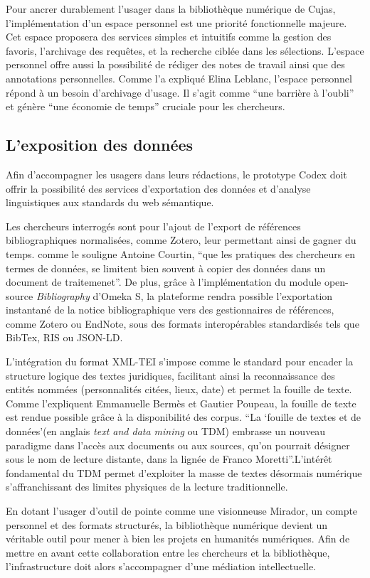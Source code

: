 Pour ancrer durablement l'usager dans la bibliothèque numérique de Cujas, l'implémentation d'un espace personnel est une priorité fonctionnelle majeure. Cet espace proposera des services simples et intuitifs comme la gestion des favoris, l'archivage des requêtes, et la recherche ciblée dans les sélections. L'espace personnel offre aussi la possibilité de rédiger des notes de travail ainsi que des annotations personnelles. Comme l'a expliqué Elina Leblanc, l'espace personnel répond à un besoin d'archivage d'usage. Il s'agit comme \enquote{une barrière à l'oubli} et génère \enquote{une économie de temps} cruciale pour les chercheurs.

\subsection{L'exposition des données}
Afin d'accompagner les usagers dans leurs rédactions, le prototype Codex doit offrir la possibilité des services d'exportation des données et d'analyse linguistiques aux standards du web sémantique.

Les chercheurs interrogés sont pour l'ajout de l'export de références bibliographiques normalisées, comme Zotero, leur permettant ainsi de gagner du temps. comme le souligne Antoine Courtin, \enquote{que les pratiques des chercheurs en termes de données, se limitent bien souvent à copier des données dans un document de traitemenet}. De plus, grâce à l'implémentation du module open-source \textit{Bibliography} d'Omeka S, la plateforme rendra possible l'exportation instantané de la notice bibliographique vers des gestionnaires de références, comme Zotero ou EndNote, sous des formats interopérables standardisés tels que BibTex, RIS ou JSON-LD.

L'intégration du format XML-TEI s'impose comme le standard pour encader la structure logique des textes juridiques, facilitant ainsi la reconnaissance des entités nommées (personnalités citées, lieux, date) et permet la fouille de texte. Comme l'expliquent Emmanuelle Bermès et Gautier Poupeau, la fouille de texte est rendue possible grâce à la disponibilité des corpus. \enquote{La \enquote{fouille de textes et de données}(en anglais \textit{text and data mining} ou TDM) embrasse un nouveau paradigme dans l'accès aux documents ou aux sources, qu'on pourrait désigner sous le nom de lecture distante, dans la lignée de Franco Moretti}.L'intérêt fondamental du TDM permet d'exploiter la masse de textes désormais numérique s'affranchissant des limites physiques de la lecture traditionnelle.

En dotant l'usager d'outil de pointe comme une visionneuse Mirador, un compte personnel et des formats structurés, la bibliothèque numérique devient un véritable outil pour mener à bien les projets en humanités numériques. Afin de mettre en avant cette collaboration entre les chercheurs et la bibliothèque, l'infrastructure doit alors s'accompagner d'une médiation intellectuelle. 